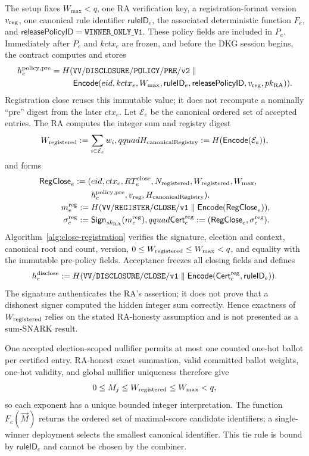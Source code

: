 \documentclass[pdflatex,sn-mathphys-num]{sn-jnl}%
\theoremstyle{thmstyleone}%
\theoremstyle{thmstyletwo}%
\theoremstyle{thmstylethree}%
\begin{document}
The setup fixes $W_{\max}<q$, one RA verification key, a registration-format
version $v_{\rm reg}$, one canonical rule identifier $\mathsf{ruleID}_e$, the
associated deterministic function $F_e$, and
$\mathsf{releasePolicyID}=\mathtt{WINNER\_ONLY\_V1}$.  These policy fields are
included in $P_e$.  Immediately after $P_e$ and $kctx_e$ are frozen, and
before the DKG session begins, the contract computes and stores
\[
\begin{aligned}
 h_e^{\rm policy,pre}=H(&\mathtt{VV/DISCLOSURE/POLICY/PRE/v2}\parallel\\
 &\mathsf{Encode}(eid,kctx_e,W_{\max},\mathsf{ruleID}_e,
                  \mathsf{releasePolicyID},
                  v_{\rm reg},pk_{\rm RA})).
\end{aligned}
\]
Registration close reuses this immutable value; it does not recompute a
nominally ``pre'' digest from the later $ctx_e$.
Let $\mathcal E_e$ be the canonical ordered set of accepted entries.  The RA
computes the integer sum and registry digest
\[
 W_{\rm registered}:=\sum_{i\in\mathcal E_e}w_i,qquad
 H_{\rm canonicalRegistry}:=H(\mathsf{Encode}(\mathcal E_e)),
\]
and forms
\[
\begin{split}
 \mathsf{RegClose}_e:=(&eid,ctx_e,RT_e^{\rm close},N_{\rm registered},
 W_{\rm registered},W_{\max},\\
 &h_e^{\rm policy,pre},v_{\rm reg},H_{\rm canonicalRegistry}),\\
 m_e^{\rm reg}:={}&H(\mathtt{VV/REGISTER/CLOSE/v1}\parallel
                  \mathsf{Encode}(\mathsf{RegClose}_e)),\\
 \sigma_e^{\rm reg}:={}&\mathsf{Sign}_{sk_{\rm RA}}(m_e^{\rm reg}),qquad
 \mathsf{Cert}_e^{\rm reg}:=(\mathsf{RegClose}_e,\sigma_e^{\rm reg}).
\end{split}
\]
Algorithm~\ref{alg:close-registration} verifies the signature, election and
context, canonical root and count, version, $0\leq W_{\rm registered}\leq
W_{\max}<q$, and equality with the immutable pre-policy fields.  Acceptance
freezes all closing fields and defines
\[
 h_e^{\rm disclose}:=H(\mathtt{VV/DISCLOSURE/CLOSE/v1}\parallel
             \mathsf{Encode}(\mathsf{Cert}_e^{\rm reg},
                             \mathsf{ruleID}_e)).
\]
The signature authenticates the RA's assertion; it does not prove that a
dishonest signer computed the hidden integer sum correctly.  Hence exactness
of $W_{\rm registered}$ relies on the stated RA-honesty assumption and is not
presented as a sum-SNARK result.

One accepted election-scoped nullifier permits at most one counted one-hot
ballot per certified entry.  RA-honest exact summation, valid committed ballot
weights, one-hot validity, and global nullifier uniqueness therefore give
\[
 0\leq M_j\leq W_{\rm registered}\leq W_{\max}<q,
\]
so each exponent has a unique bounded integer interpretation.  The function
$F_e(\vec M)$ returns the ordered set of maximal-score candidate identifiers;
a single-winner deployment selects the smallest canonical identifier.  This
tie rule is bound by $\mathsf{ruleID}_e$ and cannot be chosen by the combiner.
\end{document}
